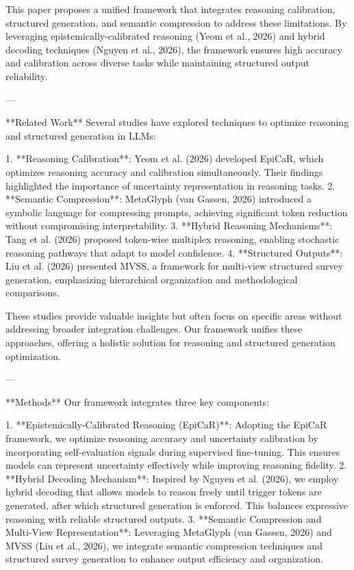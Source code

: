This paper proposes a unified framework that integrates reasoning calibration, structured generation, and semantic compression to address these limitations. By leveraging epistemically-calibrated reasoning (Yeom et al., 2026) and hybrid decoding techniques (Nguyen et al., 2026), the framework ensures high accuracy and calibration across diverse tasks while maintaining structured output reliability.  

---

**Related Work**  
Several studies have explored techniques to optimize reasoning and structured generation in LLMs:  

1. **Reasoning Calibration**: Yeom et al. (2026) developed EpiCaR, which optimizes reasoning accuracy and calibration simultaneously. Their findings highlighted the importance of uncertainty representation in reasoning tasks.  
2. **Semantic Compression**: MetaGlyph (van Gassen, 2026) introduced a symbolic language for compressing prompts, achieving significant token reduction without compromising interpretability.  
3. **Hybrid Reasoning Mechanisms**: Tang et al. (2026) proposed token-wise multiplex reasoning, enabling stochastic reasoning pathways that adapt to model confidence.  
4. **Structured Outputs**: Liu et al. (2026) presented MVSS, a framework for multi-view structured survey generation, emphasizing hierarchical organization and methodological comparisons.  

These studies provide valuable insights but often focus on specific areas without addressing broader integration challenges. Our framework unifies these approaches, offering a holistic solution for reasoning and structured generation optimization.  

---

**Methods**  
Our framework integrates three key components:  

1. **Epistemically-Calibrated Reasoning (EpiCaR)**: Adopting the EpiCaR framework, we optimize reasoning accuracy and uncertainty calibration by incorporating self-evaluation signals during supervised fine-tuning. This ensures models can represent uncertainty effectively while improving reasoning fidelity.  
2. **Hybrid Decoding Mechanism**: Inspired by Nguyen et al. (2026), we employ hybrid decoding that allows models to reason freely until trigger tokens are generated, after which structured generation is enforced. This balances expressive reasoning with reliable structured outputs.  
3. **Semantic Compression and Multi-View Representation**: Leveraging MetaGlyph (van Gassen, 2026) and MVSS (Liu et al., 2026), we integrate semantic compression techniques and structured survey generation to enhance output efficiency and organization.  

